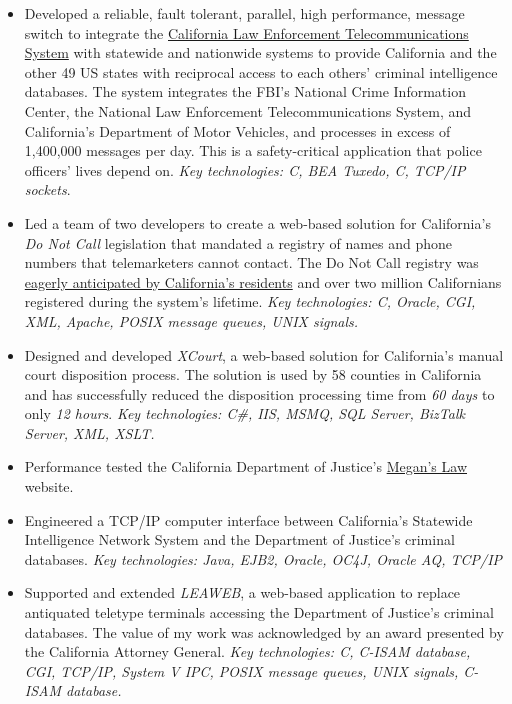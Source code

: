 \documentclass[a4paper,12pt]{article}
\begin{document}
\begin{itemize}

\item Developed a reliable, fault tolerant, parallel, high performance, message switch to integrate the \href{http://definitions.uslegal.com/c/clets/}{California Law Enforcement Telecommunications System} with statewide and nationwide systems to provide California and the other 49 US states with reciprocal access to each others' criminal intelligence databases.  The system integrates the FBI's National Crime Information Center, the National Law Enforcement Telecommunications System, and California's Department of Motor Vehicles, and processes in excess of 1,400,000 messages per day.  This is a safety-critical application that police officers' lives depend on.  \emph{Key technologies: C, BEA Tuxedo, C, TCP/IP sockets}.

\item Led a team of two developers to create a web-based solution for California's \emph{Do Not Call} legislation that mandated a registry of names and phone numbers that telemarketers cannot contact.  The Do Not Call registry was \href{http://www.sfgate.com/cgi-bin/article.cgi?f=/c/a/2003/03/31/MN5478.DTL}{eagerly anticipated by California's residents} and over two million Californians registered during the system's lifetime.  \emph{Key technologies: C, Oracle, CGI, XML, Apache, POSIX message queues, UNIX signals.}

\item Designed and developed \emph{XCourt}, a web-based solution for California's manual court disposition process. The solution is used by 58 counties in California and has successfully reduced the disposition processing time from \emph{60 days} to only \emph{12 hours}. \emph{Key technologies: C\#, IIS, MSMQ, SQL Server, BizTalk Server, XML, XSLT.}

\item Performance tested the California Department of Justice's \href{http://www.meganslaw.ca.gov/}{Megan's Law} website.

\item Engineered a TCP/IP computer interface between California's Statewide Intelligence Network System and the Department of Justice's criminal databases. \emph{Key technologies: Java, EJB2, Oracle, OC4J, Oracle AQ, TCP/IP }

\item Supported and extended \emph{LEAWEB}, a web-based application to replace antiquated teletype terminals accessing the Department of Justice's criminal databases.  The value of my work was acknowledged by an award presented by the California Attorney General. \emph{Key technologies: C, C-ISAM database, CGI, TCP/IP, System V IPC, POSIX message queues, UNIX signals, C-ISAM database.}

\end{itemize}
\end{document}
